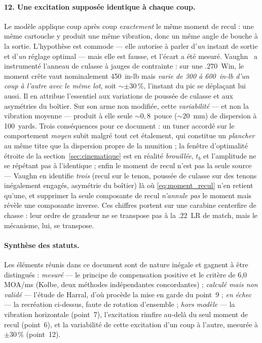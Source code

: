 \documentclass[12pt,a4paper]{article}
\begin{document}
	\paragraph{12. Une excitation supposée identique à chaque coup.} Le modèle applique coup après coup \emph{exactement} le même moment de recul : une même cartouche y produit une même vibration, donc un même angle de bouche à la sortie. L'hypothèse est commode --- elle autorise à parler d'\emph{un} instant de sortie et d'\emph{un} réglage optimal --- mais elle est fausse, et l'écart a été mesuré. Vaughn~\cite{Vaughn} a instrumenté l'anneau de culasse à jauges de contrainte : sur une .270~Win, le moment crête vaut nominalement 450~in-lb mais \emph{varie de 300 à 600~in-lb d'un coup à l'autre avec le même lot}, soit $\sim \pm 30\,\%$, l'instant du pic se déplaçant lui aussi. Il en attribue l'essentiel aux variations de poussée de culasse et aux asymétries du boîtier. Sur son arme non modifiée, cette \emph{variabilité} --- et non la vibration moyenne --- produit à elle seule $\sim 0{,}8$~pouce ($\sim 20$~mm) de dispersion à 100~yards. Trois conséquences pour ce document : un tuner accordé sur le comportement \emph{moyen} subit malgré tout cet étalement, qui constitue un \emph{plancher} au même titre que la dispersion propre de la munition ; la fenêtre d'optimalité étroite de la section~\ref{sec:cinematique} est en réalité \emph{brouillée}, $t_b$ et l'amplitude ne se répétant pas à l'identique ; enfin le moment de recul n'est pas la seule source --- Vaughn en identifie \emph{trois} (recul sur le tenon, poussée de culasse sur des tenons inégalement engagés, asymétrie du boîtier) là où \eqref{eq:moment_recul} n'en retient qu'une, et supprimer la seule composante de recul \emph{n'annule pas} le moment mais révèle une composante inverse. Ces chiffres portent sur une carabine centerfire de chasse : leur ordre de grandeur ne se transpose pas à la .22~LR de match, mais le mécanisme, lui, se transpose.

	\paragraph{Synthèse des statuts.} Les éléments réunis dans ce document sont de nature inégale et gagnent à être distingués : \emph{mesuré} --- le principe de compensation positive et le critère de 6,0 MOA/ms (Kolbe, deux méthodes indépendantes concordantes) ; \emph{calculé mais non validé} --- l'étude de Harral, d'où procède la mise en garde du point~9 ; \emph{en échec} --- la recréation ci-dessus, faute de rotation d'ensemble ; \emph{hors modèle} --- la vibration horizontale (point~7), l'excitation rimfire au-delà du seul moment de recul (point~6), et la variabilité de cette excitation d'un coup à l'autre, mesurée à $\pm 30\,\%$ (point~12).
\end{document}
